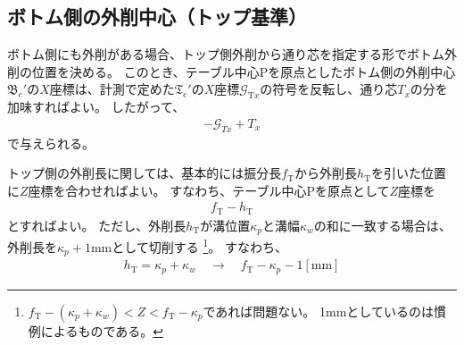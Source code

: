 \subsection{ボトム側の外削中心（トップ基準）}
ボトム側にも外削がある場合、トップ側外削から通り芯を指定する形でボトム外削の位置を決める。
このとき、テーブル中心Pを原点としたボトム側の外削中心$\mathfrak B_\mathrm c'$の$X$座標は、計測で定めた$\mathfrak T_\mathrm c'$の$X$座標$\mathcal G_{\mathrm Tx}$の符号を反転し、通り芯$T_x$の分を加味すればよい。
したがって、
\begin{align}
  \label{eq:TbasedTx}
  -\mathcal G_{Tx}+T_x
\end{align}
で与えられる。



\clearpage
トップ側の外削長に関しては、基本的には振分長$f_\mathrm T$から外削長$h_\mathrm T$を引いた位置に$Z$座標を合わせればよい。
すなわち、テーブル中心Pを原点として$Z$座標を
\begin{align*}
  f_\mathrm T - h_\mathrm T
\end{align*}
とすればよい。
ただし、外削長$h_\mathrm T$が溝位置$\kappa_p$と溝幅$\kappa_w$の和に一致する場合は、外削長を$\kappa_p+1$mmとして切削する
\footnote{$f_\mathrm T-(\kappa_p+\kappa_w) < Z < f_\mathrm T-\kappa_p$であれば問題ない。
1mmとしているのは慣例によるものである。}。
すなわち、
\begin{align*}
  h_\mathrm T = \kappa_p+\kappa_w \quad \longrightarrow \quad f_\mathrm T-\kappa_p-1[\mathrm{mm}]
\end{align*}



